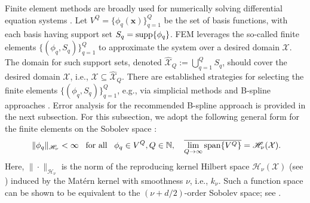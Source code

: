 \documentclass[aos,preprint]{imsart}
\theoremstyle{plain}
\newcommand{\NatInt}{\mathbb N}
\newcommand{\CalX}{\mathcal X}
\newcommand{\cmtS}[1]{{\color{red}{(Simon: #1)}}}
\theoremstyle{remark}
\begin{document}
Finite element methods are broadly used for numerically solving differential equation systems \citep{huebner2001finite}. Let $V^Q=\{\phi_q(\mathbf{x})\}_{q=1}^Q$ be the set of basis functions, with each basis having support set $S_q = {\rm supp}\{\phi_q\}$. FEM leverages the so-called finite elements $\{(\phi_q, S_q)\}_{q=1}^Q$ to approximate the system over a desired domain $\mathcal{X}$. The domain for such support sets, denoted $\hat{\CalX}_Q := \bigcup_{q=1}^Q S_q$, should cover the desired domain $\mathcal{X}$, i.e., $\CalX \subseteq \hat{\CalX}_Q$. There are established strategies for selecting the finite elements $\{(\phi_q, S_q)\}_{q=1}^Q$, e.g., via simplicial methods \citep{dang2012triangulations} and B-spline approaches \citep{hollig2003finite}. Error analysis for the recommended B-spline approach is provided in the next subsection. For this subsection, we adopt the following general form for the finite elements on the Sobolev space  \citep[Chapter 2]{Brenner08}:
\begin{equation}
\ \|\phi_q\|_{\mathscr{H}_{\nu}}<\infty \;\;\; \text{for all} \;\;\; \phi_q\in V^Q, Q\in\NatInt, \quad \overline{\lim_{Q\to\infty}{\rm span}\{V^Q\}} = \mathscr{H}_{\nu}(\CalX).
\label{eq:femreg}
\end{equation}
Here, $\|\cdot\|_{\mathscr{H}_{\nu}}$ is the norm of the reproducing kernel Hilbert space $\mathscr{H}_{\nu}(\CalX)$ (see \cite{Wendland10}) induced by the Mat\'ern kernel with smoothness $\nu$, i.e., $k_{\nu}$. Such a function space can be shown to be equivalent to the $(\nu+d/2)$-order Sobolev space; see \cite[Corollary 1]{Tuo16}. 


\end{document}

